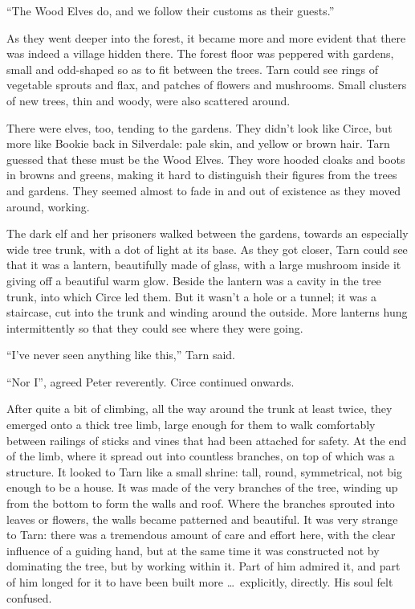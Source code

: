 ``The Wood Elves do, and we follow their customs as their guests.''

As they went deeper into the forest, it became more and more evident that there was indeed a village hidden there.  The forest floor was peppered with gardens, small and odd-shaped so as to fit between the trees.  Tarn could see rings of vegetable sprouts and flax, and patches of flowers and mushrooms.  Small clusters of new trees, thin and woody, were also scattered around.

There were elves, too, tending to the gardens.  They didn't look like Circe, but more like Bookie back in Silverdale: pale skin, and yellow or brown hair.  Tarn guessed that these must be the Wood Elves.  They wore hooded cloaks and boots in browns and greens, making it hard to distinguish their figures from the trees and gardens.  They seemed almost to fade in and out of existence as they moved around, working.

The dark elf and her prisoners walked between the gardens, towards an especially wide tree trunk, with a dot of light at its base.  As they got closer, Tarn could see that it was a lantern, beautifully made of glass, with a large mushroom inside it giving off a beautiful warm glow.  Beside the lantern was a cavity in the tree trunk, into which Circe led them.  But it wasn't a hole or a tunnel; it was a staircase, cut into the trunk and winding around the outside.  More lanterns hung intermittently so that they could see where they were going.

``I've never seen anything like this,'' Tarn said.

``Nor I'', agreed Peter reverently.  Circe continued onwards.

After quite a bit of climbing, all the way around the trunk at least twice, they emerged onto a thick tree limb, large enough for them to walk comfortably between railings of sticks and vines that had been attached for safety.  At the end of the limb, where it spread out into countless branches, on top of which was a structure.  It looked to Tarn like a small shrine: tall, round, symmetrical, not big enough to be a house.  It was made of the very branches of the tree, winding up from the bottom to form the walls and roof.  Where the branches sprouted into leaves or flowers, the walls became patterned and beautiful.  It was very strange to Tarn: there was a tremendous amount of care and effort here, with the clear influence of a guiding hand, but at the same time it was constructed not by dominating the tree, but by working within it.  Part of him admired it, and part of him longed for it to have been built more \ldots\ explicitly, directly.  His soul felt confused.

